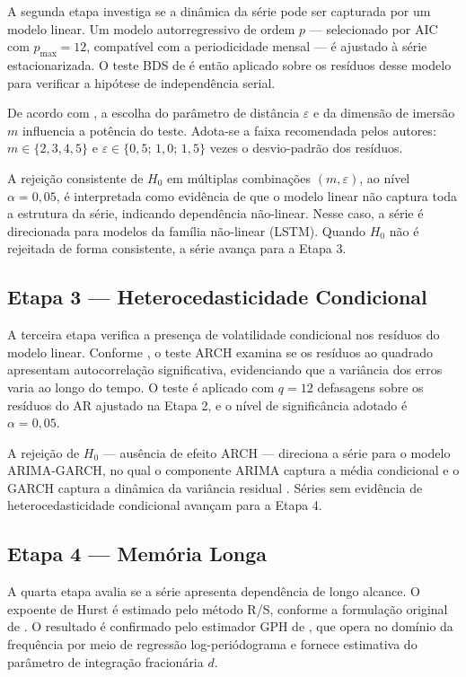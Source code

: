 \documentclass[
  12pt,
  openright,
  twoside,
  a4paper,
  english,
  brazil
]{abntex2}
\begin{document}
A segunda etapa investiga se a dinâmica da série pode ser capturada por um modelo linear. Um modelo autorregressivo de ordem $p$ — selecionado por AIC com $p_{\max} = 12$, compatível com a periodicidade mensal — é ajustado à série estacionarizada. O teste BDS de  é então aplicado sobre os resíduos desse modelo para verificar a hipótese de independência serial.

De acordo com , a escolha do parâmetro de distância $\varepsilon$ e da dimensão de imersão $m$ influencia a potência do teste. Adota-se a faixa recomendada pelos autores: $m \in \{2, 3, 4, 5\}$ e $\varepsilon \in \{0{,}5;\, 1{,}0;\, 1{,}5\}$ vezes o desvio-padrão dos resíduos.

A rejeição consistente de $H_0$ em múltiplas combinações $(m, \varepsilon)$, ao nível $\alpha = 0{,}05$, é interpretada como evidência de que o modelo linear não captura toda a estrutura da série, indicando dependência não-linear. Nesse caso, a série é direcionada para modelos da família não-linear (LSTM). Quando $H_0$ não é rejeitada de forma consistente, a série avança para a Etapa 3.

\subsection{Etapa 3 — Heterocedasticidade Condicional}
\label{subsec:etapa3}

A terceira etapa verifica a presença de volatilidade condicional nos resíduos do modelo linear. Conforme , o teste ARCH examina se os resíduos ao quadrado apresentam autocorrelação significativa, evidenciando que a variância dos erros varia ao longo do tempo. O teste é aplicado com $q = 12$ defasagens sobre os resíduos do AR ajustado na Etapa 2, e o nível de significância adotado é $\alpha = 0{,}05$.

A rejeição de $H_0$ — ausência de efeito ARCH — direciona a série para o modelo ARIMA-GARCH, no qual o componente ARIMA captura a média condicional e o GARCH captura a dinâmica da variância residual \cite{bollerslev1986generalized}. Séries sem evidência de heterocedasticidade condicional avançam para a Etapa 4.

\subsection{Etapa 4 — Memória Longa}
\label{subsec:etapa4}

A quarta etapa avalia se a série apresenta dependência de longo alcance. O expoente de Hurst é estimado pelo método R/S, conforme a formulação original de . O resultado é confirmado pelo estimador GPH de , que opera no domínio da frequência por meio de regressão log-periódograma e fornece estimativa do parâmetro de integração fracionária $d$.
\end{document}
